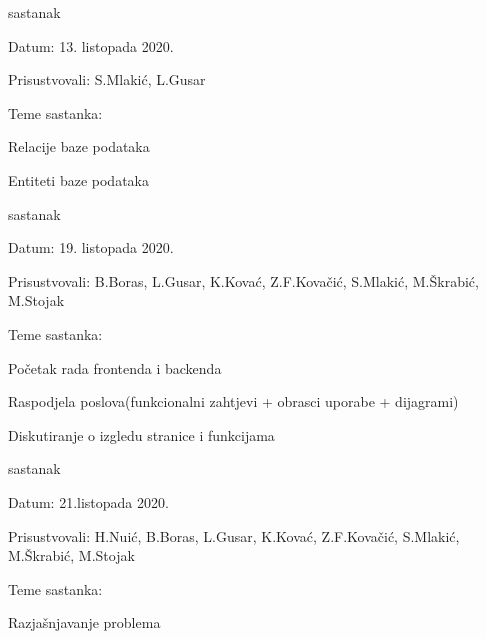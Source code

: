 \begin{packed_enum}
			\item  sastanak
			
			\item[] \begin{packed_item}
				\item Datum: 13. listopada 2020.
				\item Prisustvovali: S.Mlakić, L.Gusar
				\item Teme sastanka:
				\begin{packed_item}
					\item  Relacije baze podataka
					\item  Entiteti baze podataka\\
				\end{packed_item}
			\end{packed_item}
			\newpage
			\item  sastanak
			\item[] \begin{packed_item}
				\item Datum: 19. listopada 2020.
				\item Prisustvovali: B.Boras, L.Gusar, K.Kovać, Z.F.Kovačić, S.Mlakić, M.Škrabić, M.Stojak
				\item Teme sastanka:
				\begin{packed_item}
					\item  Početak rada frontenda i backenda
					\item  Raspodjela poslova(funkcionalni zahtjevi + obrasci uporabe + dijagrami)
					\item  Diskutiranje o izgledu stranice i funkcijama\\
				\end{packed_item}
			\end{packed_item}
		
			\item  sastanak
			
			\item[] \begin{packed_item}
				\item Datum:  21.listopada 2020.
				\item Prisustvovali: H.Nuić, B.Boras, L.Gusar, K.Kovać, Z.F.Kovačić, S.Mlakić, M.Škrabić, M.Stojak
				\item Teme sastanka:
				\begin{packed_item}
					\item  Razjašnjavanje problema\\
				\end{packed_item}
			\end{packed_item}
		

\end{packed_enum}
